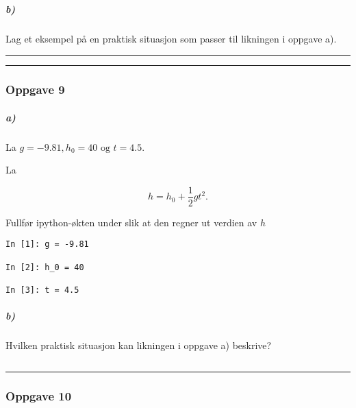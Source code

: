 \documentclass[11pt]{article}
\makeatletter
\newcommand{\boxspacing}{\kern\kvtcb@left@rule\kern\kvtcb@boxsep}
\newcommand{\prompt}[4]{
        \ttfamily\llap{{\color{#2}[#3]:\hspace{3pt}#4}}\vspace{-\baselineskip}
    }
\makeatother
\begin{document}
    \hypertarget{b}{%
\subparagraph{b)}\label{b}}

Lag et eksempel på en praktisk situasjon som passer til likningen i
oppgave a).

\begin{center}\rule{0.5\linewidth}{\linethickness}\end{center}

    \begin{center}\rule{0.5\linewidth}{\linethickness}\end{center}

\hypertarget{oppgave-9}{%
\subsubsection{Oppgave 9}\label{oppgave-9}}

\hypertarget{a}{%
\subparagraph{a)}\label{a}}

La \(g = -9.81, h_0 = 40 \text{ og } t = 4.5\).

La

\[ h = h_0 + \frac{1}{2}gt^2.\]

Fullfør ipython-økten under slik at den regner ut verdien av \(h\)

\begin{verbatim}
In [1]: g = -9.81

In [2]: h_0 = 40

In [3]: t = 4.5
\end{verbatim}

\hypertarget{b}{%
\subparagraph{b)}\label{b}}

Hvilken praktisk situasjon kan likningen i oppgave a) beskrive?

    \begin{tcolorbox}[breakable, size=fbox, boxrule=1pt, pad at break*=1mm,colback=cellbackground, colframe=cellborder]
\prompt{In}{incolor}{ }{\boxspacing}
\begin{Verbatim}[commandchars=\\\{\}]

\end{Verbatim}
\end{tcolorbox}

    \begin{center}\rule{0.5\linewidth}{\linethickness}\end{center}

\hypertarget{oppgave-10}{%
\subsubsection{Oppgave 10}\label{oppgave-10}}
\end{document}
